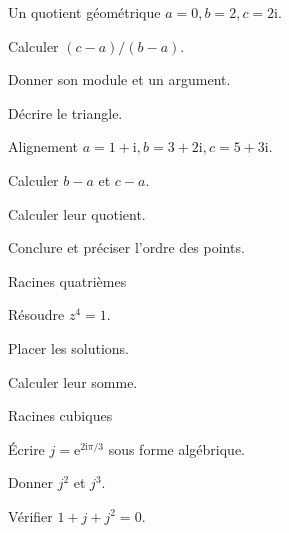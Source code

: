 \exercices
{}
\begingroup\renewcommand{\otBesoinPlace}[1]{}\begin{minipage}{\linewidth}
\begin{exercice}[1]{Un quotient géométrique}
$a=0,b=2,c=2\mathrm i$.
\begin{questions}
\item Calculer $(c-a)/(b-a)$.
\item Donner son module et un argument.
\item Décrire le triangle.
\end{questions}
\end{exercice}
\begin{exercice}[1]{Alignement}
$a=1+\mathrm i,b=3+2\mathrm i,c=5+3\mathrm i$.
\begin{questions}
\item Calculer $b-a$ et $c-a$.
\item Calculer leur quotient.
\item Conclure et préciser l’ordre des points.
\end{questions}
\end{exercice}
\begin{exercice}[1]{Racines quatrièmes}

\begin{questions}
\item Résoudre $z^4=1$.
\item Placer les solutions.
\item Calculer leur somme.
\end{questions}
\end{exercice}
\begin{exercice}[1]{Racines cubiques}

\begin{questions}
\item Écrire $j=\mathrm e^{2\mathrm i\pi/3}$ sous forme algébrique.
\item Donner $j^2$ et $j^3$.
\item Vérifier $1+j+j^2=0$.
\end{questions}
\end{exercice}
\end{minipage}\endgroup
\clearpage
{}
